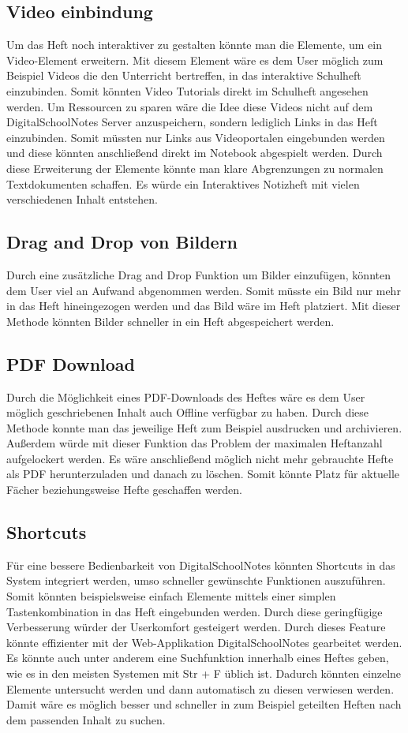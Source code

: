 \subsection{Video einbindung}
Um das Heft noch interaktiver zu gestalten könnte man die Elemente, um ein Video-Element erweitern. Mit diesem Element wäre es dem User möglich zum Beispiel Videos die den Unterricht bertreffen, in das interaktive Schulheft einzubinden. Somit könnten Video Tutorials direkt im Schulheft angesehen werden. Um Ressourcen zu sparen wäre die Idee diese Videos nicht auf dem DigitalSchoolNotes Server anzuspeichern, sondern lediglich Links in das Heft einzubinden. Somit müssten nur Links aus Videoportalen eingebunden werden und diese könnten anschließend direkt im Notebook abgespielt werden. Durch diese Erweiterung der Elemente könnte man klare Abgrenzungen zu normalen Textdokumenten schaffen. Es würde ein Interaktives Notizheft mit vielen verschiedenen Inhalt entstehen. 
\subsection{Drag and Drop von Bildern}
Durch eine zusätzliche Drag and Drop Funktion um Bilder einzufügen, könnten dem User viel an Aufwand abgenommen werden. Somit müsste ein Bild nur mehr in das Heft hineingezogen werden und das Bild wäre im Heft platziert. Mit dieser Methode könnten Bilder schneller in ein Heft abgespeichert werden.  
\subsection{PDF Download}
Durch die Möglichkeit eines PDF-Downloads des Heftes wäre es dem User möglich geschriebenen Inhalt auch Offline verfügbar zu haben. Durch diese Methode konnte man das jeweilige Heft zum Beispiel ausdrucken und archivieren. Außerdem würde mit dieser Funktion das Problem der maximalen Heftanzahl aufgelockert werden. Es wäre anschließend möglich nicht mehr gebrauchte Hefte als PDF herunterzuladen und danach zu löschen. Somit könnte Platz für aktuelle Fächer beziehungsweise Hefte geschaffen werden.
\subsection{Shortcuts}
Für eine bessere Bedienbarkeit von DigitalSchoolNotes könnten Shortcuts in das System integriert werden, umso schneller gewünschte Funktionen auszuführen. Somit könnten beispielsweise einfach Elemente mittels einer simplen Tastenkombination in das Heft eingebunden werden. Durch diese geringfügige Verbesserung würder der Userkomfort gesteigert werden. Durch dieses Feature könnte effizienter mit der Web-Applikation DigitalSchoolNotes gearbeitet werden.\\
Es könnte auch unter anderem eine Suchfunktion innerhalb eines Heftes geben, wie es in den meisten Systemen mit Str + F üblich ist. Dadurch könnten einzelne Elemente untersucht werden und dann automatisch zu diesen verwiesen werden. Damit wäre es möglich besser und schneller in zum Beispiel geteilten Heften nach dem passenden Inhalt zu suchen. 
